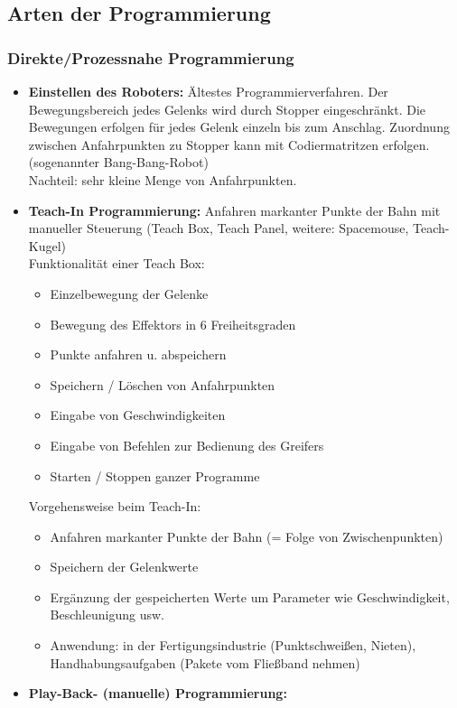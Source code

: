 \documentclass[11pt]{scrartcl}
\begin{document}
\subsection{Arten der Programmierung}
\subsubsection{Direkte/Prozessnahe Programmierung}
\begin{itemize}
\item \textbf{Einstellen des Roboters:} Ältestes Programmierverfahren.
Der Bewegungsbereich jedes Gelenks wird durch Stopper eingeschränkt.
Die Bewegungen erfolgen für jedes Gelenk einzeln bis zum Anschlag.
Zuordnung zwischen Anfahrpunkten zu Stopper kann mit Codiermatritzen erfolgen.
(sogenannter \glqq Bang-Bang-Robot\grqq)\\
Nachteil: sehr kleine Menge von Anfahrpunkten.
\item \textbf{Teach-In Programmierung:} Anfahren markanter Punkte der Bahn mit manueller Steuerung
(Teach Box, Teach Panel, weitere: Spacemouse, Teach-Kugel)\\
Funktionalität einer Teach Box:
\begin{itemize}
\item Einzelbewegung der Gelenke
\item Bewegung des Effektors in 6 Freiheitsgraden
\item Punkte anfahren u. abspeichern
\item Speichern / Löschen von Anfahrpunkten
\item Eingabe von Geschwindigkeiten
\item Eingabe von Befehlen zur Bedienung des Greifers
\item Starten / Stoppen ganzer Programme
\end{itemize}
Vorgehensweise beim Teach-In:
\begin{itemize}
\item Anfahren markanter Punkte der Bahn (= Folge von Zwischenpunkten)
\item Speichern der Gelenkwerte
\item Ergänzung der gespeicherten Werte
um Parameter wie Geschwindigkeit, Beschleunigung usw.
\item Anwendung: in der Fertigungsindustrie (Punktschweißen, Nieten), Handhabungsaufgaben (Pakete vom Fließband nehmen)
\end{itemize}
\item \textbf{Play-Back- (manuelle) Programmierung:}
\begin{itemize}

\end{itemize}
\end{itemize}
\end{document}
